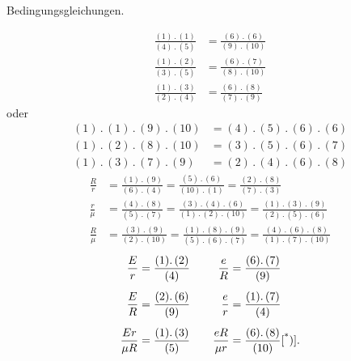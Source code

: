 \clearpage{}
\begin{center}Bedingungsgleichungen.\end{center}
\[
\begin{aligned}
\frac{(1)\mathpunct{.}(1)}{(4)\mathpunct{.}(5)}&=\frac{(6)\mathpunct{.}(6)}{(9)\mathpunct{.}(10)}\\[1ex]
\frac{(1)\mathpunct{.}(2)}{(3)\mathpunct{.}(5)}&=\frac{(6)\mathpunct{.}(7)}{(8)\mathpunct{.}(10)}\\[1ex]
\frac{(1)\mathpunct{.}(3)}{(2)\mathpunct{.}(4)}&=\frac{(6)\mathpunct{.}(8)}{(7)\mathpunct{.}(9)}
\end{aligned}
\]
\noindent oder
\[
\begin{aligned}
(1)\mathpunct{.}(1)\mathpunct{.}(9)\mathpunct{.}(10)&=(4)\mathpunct{.}(5)\mathpunct{.}(6)\mathpunct{.}(6)\\
(1)\mathpunct{.}(2)\mathpunct{.}(8)\mathpunct{.}(10)&=(3)\mathpunct{.}(5)\mathpunct{.}(6)\mathpunct{.}(7)\\
(1)\mathpunct{.}(3)\mathpunct{.}(7)\mathpunct{.}(9)&=(2)\mathpunct{.}(4)\mathpunct{.}(6)\mathpunct{.}(8)
\end{aligned}
\]
\[
\begin{aligned}
\frac Rr&=\frac{(1)\mathpunct{.}(9)}{(6)\mathpunct{.}(4)}=\frac{(5)\mathpunct{.}(6)}{(10)\mathpunct{.}(1)}=\frac{(2)\mathpunct{.}(8)}{(7)\mathpunct{.}(3)}\\[1ex]
\frac r\mu&=\frac{(4)\mathpunct{.}(8)}{(5)\mathpunct{.}(7)}=\frac{(3)\mathpunct{.}(4)\mathpunct{.}(6)}{(1)\mathpunct{.}(2)\mathpunct{.}(10)}=\frac{(1)\mathpunct{.}(3)\mathpunct{.}(9)}{(2)\mathpunct{.}(5)\mathpunct{.}(6)}\\[1ex]
\frac R\mu&=\frac{(3)\mathpunct{.}(9)}{(2)\mathpunct{.}(10)}=\frac{(1)\mathpunct{.}(8)\mathpunct{.}(9)}{(5)\mathpunct{.}(6)\mathpunct{.}(7)}=\frac{(4)\mathpunct{.}(6)\mathpunct{.}(8)}{(1)\mathpunct{.}(7)\mathpunct{.}(10)}
\end{aligned}
\]
\[
\begin{alignedat}{2}
\frac Er&=\frac{(1)\mathpunct{.}(2)}{(4)}\qquad&\frac eR&=\frac{(6)\mathpunct{.}(7)}{(9)}\\[1ex]
\frac ER&=\frac{(2)\mathpunct{.}(6)}{(9)}&\frac er&=\frac{(1)\mathpunct{.}(7)}{(4)}\\[1ex]
\frac{Er}{\mu R}&=\frac{(1)\mathpunct{.}(3)}{(5)}&\frac{eR}{\mu r}&=\frac{(6)\mathpunct{.}(8)}{(10)}\text{[\textsuperscript{*})]}.
\end{alignedat}
\]
\begingroup\renewcommand{\thefootnote}{}\endgroup
